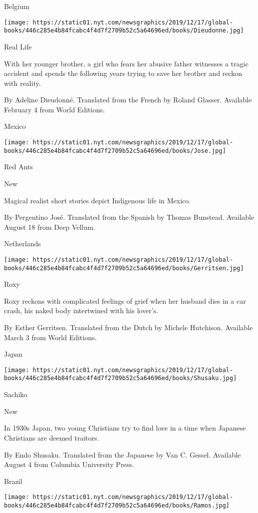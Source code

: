Belgium

\texttt{[image: https://static01.nyt.com/newsgraphics/2019/12/17/global-books/446c285e4b84fcabc4f4d7f2709b52c5a64696ed/books/Dieudonne.jpg]}

Real Life

With her younger brother, a girl who fears her abusive father witnesses
a tragic accident and spends the following years trying to save her
brother and reckon with reality.

 By Adeline Dieudonné. Translated from the French by Roland Glasser.
Available February 4 from World Editions.

Mexico

\texttt{[image: https://static01.nyt.com/newsgraphics/2019/12/17/global-books/446c285e4b84fcabc4f4d7f2709b52c5a64696ed/books/Jose.jpg]}

Red Ants

New

Magical realist short stories depict Indigenous life in Mexico.

 By Pergentino José. Translated from the Spanish by Thomas Bunstead.
Available August 18 from Deep Vellum.

Netherlands

\texttt{[image: https://static01.nyt.com/newsgraphics/2019/12/17/global-books/446c285e4b84fcabc4f4d7f2709b52c5a64696ed/books/Gerritsen.jpg]}

Roxy

Roxy reckons with complicated feelings of grief when her husband dies in
a car crash, his naked body intertwined with his lover's.

 By Esther Gerritsen. Translated from the Dutch by Michele Hutchison.
Available March 3 from World Editions.

Japan

\texttt{[image: https://static01.nyt.com/newsgraphics/2019/12/17/global-books/446c285e4b84fcabc4f4d7f2709b52c5a64696ed/books/Shusaku.jpg]}

Sachiko

New

In 1930s Japan, two young Christians try to find love in a time when
Japanese Christians are deemed traitors.

 By Endo Shusaku. Translated from the Japanese by Van C. Gessel.
Available August 4 from Columbia University Press.

Brazil

\texttt{[image: https://static01.nyt.com/newsgraphics/2019/12/17/global-books/446c285e4b84fcabc4f4d7f2709b52c5a64696ed/books/Ramos.jpg]}

